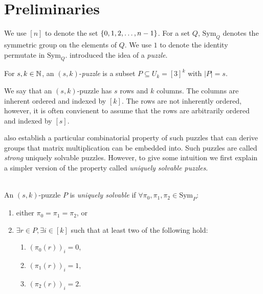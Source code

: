\documentclass[11pt]{article}
\newcommand\sse{\subseteq}
\newcommand\Sym[1]{\ensuremath{\mathrm{Sym}_{#1}}}
\begin{document}
\section{Preliminaries}
\label{sec:prelim}

\newcommand\ordset[1]{\ensuremath{[#1]}}

We use $\ordset{n}$ to denote the set $\left\{ 0,1,2,\ldots, n-1 \right\}$.  For
a set $Q$, $\Sym{Q}$ denotes the symmetric group on the elements of
$Q$.  We use $1$ to denote the identity permutate in
$\Sym{Q}$. \cite{cksu05} introduced the idea of a \emph{puzzle}.

\begin{definition}[Puzzle]
  For $s, k \in \mathbb{N}$, an $(s,k)$-\emph{puzzle} is a
  subset $P \sse U_k = \ordset{3}^k$ with $|P| = s$.
\end{definition}

We say that an $(s,k)$-puzzle has $s$ rows and $k$ columns.  The
columns are inherent ordered and indexed by $\ordset{k}$.  The rows are not
inherently ordered, however, it is often convienent to assume that the
rows are arbitrarily ordered and indexed by $\ordset{s}$.

\cite{cksu05} also establish a particular combinatorial property of
such puzzles that can derive groups that matrix multiplication can be
embedded into.  Such puzzles are called \emph{strong} uniquely
solvable puzzles.  However, to give some intuition we first explain a
simpler version of the property called \emph{uniquely solvable
  puzzles}.

\begin{definition}
  \label{def:strong-USP}
  ~\\An $(s,k)$-puzzle $P$ is \emph{uniquely solvable} if
  $\forall \pi_0, \pi_1, \pi_2 \in \Sym{P}:$
  \begin{enumerate}
  \item either $\pi_0 = \pi_1 = \pi_2$, or
  \item $\exists r \in P, \exists i \in \ordset{k}$ such that at least two
    of the following hold:
    \begin{enumerate}
    \item $(\pi_0(r))_i = 0$,
    \item $(\pi_1(r))_i = 1$,
    \item $(\pi_2(r))_i = 2$.
    \end{enumerate}
  \end{enumerate}
\end{definition}
\end{document}
